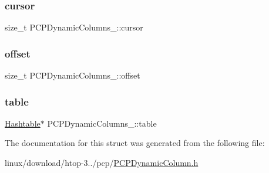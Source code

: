 \subsubsection{\texorpdfstring{cursor}{cursor}}
{\footnotesize\ttfamily size\+\_\+t P\+C\+P\+Dynamic\+Columns\+\_\+\+::cursor}

\mbox{\label{structPCPDynamicColumns___a6078c36bcd42b8a3c17feff070daa684}} 
\subsubsection{\texorpdfstring{offset}{offset}}
{\footnotesize\ttfamily size\+\_\+t P\+C\+P\+Dynamic\+Columns\+\_\+\+::offset}

\mbox{\label{structPCPDynamicColumns___a000998daccef615fde6332b9c0be9349}} 
\subsubsection{\texorpdfstring{table}{table}}
{\footnotesize\ttfamily \hyperlink{Hashtable_8h_af67f943dab16c5d7d465c18053edf47f}{Hashtable}$\ast$ P\+C\+P\+Dynamic\+Columns\+\_\+\+::table}



The documentation for this struct was generated from the following file\+:\begin{DoxyCompactItemize}
\item 
linux/download/htop-\/3../pcp/\hyperlink{PCPDynamicColumn_8h}{P\+C\+P\+Dynamic\+Column.\+h}\end{DoxyCompactItemize}
